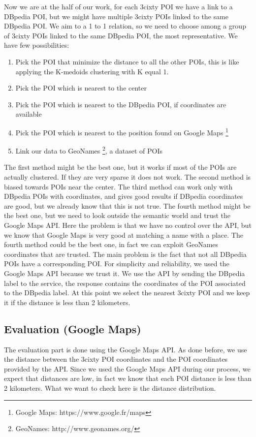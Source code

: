 \documentclass[paper=a4, fontsize=11pt]{scrartcl}
\begin{document}
Now we are at the half of our work, for each 3cixty POI we have a link to a DBpedia POI, but we might have multiple 3cixty POIs linked to the same DBpedia POI. We aim to a 1 to 1 relation, so we need to choose among a group of 3cixty POIs linked to the same DBpedia POI, the most representative.
We have few possibilities:
\begin{enumerate}
\item Pick the POI that minimize the distance to all the other POIs, this is like applying the K-medoids clustering with K equal 1.
\item Pick the POI which is nearest to the center
\item Pick the POI which is nearest to the DBpedia POI, if coordinates are available
\item Pick the POI which is nearest to the position found on Google Maps \footnote{Google Maps: https://www.google.fr/maps}
\item Link our data to GeoNames \footnote{GeoNames: http://www.geonames.org/}, a dataset of POIs
\end{enumerate}
The first method might be the best one, but it works if most of the POIs are actually clustered. If they are very sparse it does not work.
The second method is biased towards POIs near the center.
The third method can work only with DBpedia POIs with coordinates, and gives good results if DBpedia coordinates are good, but we already know that this is not true.
The fourth method might be the best one, but we need to look outside the semantic world and trust the Google Maps API. Here the problem is that we have no control over the API, but we  know that Google Maps is very good at matching a name with a place.
The fourth method could be the best one, in fact we can exploit GeoNames coordinates that are trusted. The main problem is the fact that not all DBpedia POIs have a corresponding POI.
For simplicity and reliability, we used the Google Maps API because we trust it.
We use the API by sending the DBpedia label to the service, the response contains the coordinates of the POI associated to the DBpedia label. At this point we select the nearest 3cixty POI and we keep it if the distance is less than 2 kilometers.
\subsection{Evaluation (Google Maps)}
The evaluation part is done using the Google Maps API. As done before, we use the distance between the 3cixty POI coordinates and the POI coordinates provided by the API. Since we used the Google Maps API during our process, we expect that distances are low, in fact we know that each POI distance is less than 2 kilometers. What we want to check here is the distance distribution.
\end{document}
